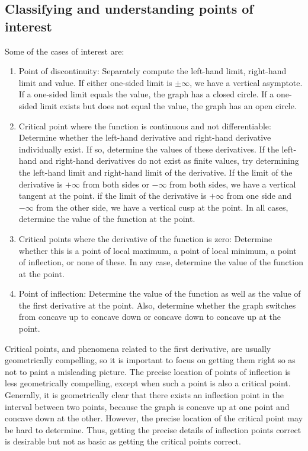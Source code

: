 \documentclass[10pt]{amsart}
\begin{document}
\subsection{Classifying and understanding points of interest}

Some of the cases of interest are:

\begin{enumerate}
\item Point of discontinuity: Separately compute the left-hand limit,
  right-hand limit and value. If either one-sided limit is $\pm
  \infty$, we have a vertical asymptote. If a one-sided limit equals
  the value, the graph has a closed circle. If a one-sided limit
  exists but does not equal the value, the graph has an open circle.
\item Critical point where the function is continuous and not
  differentiable: Determine whether the left-hand derivative and
  right-hand derivative individually exist. If so, determine the
  values of these derivatives. If the left-hand and right-hand
  derivatives do not exist as finite values, try determining the
  left-hand limit and right-hand limit of the derivative. If the limit
  of the derivative is $+\infty$ from both sides or $-\infty$ from
  both sides, we have a vertical tangent at the point. if the limit of
  the derivative is $+\infty$ from one side and $-\infty$ from the
  other side, we have a vertical cusp at the point. In all cases,
  determine the value of the function at the point.
\item Critical points where the derivative of the function is zero:
  Determine whether this is a point of local maximum, a point of local
  minimum, a point of inflection, or none of these. In any case,
  determine the value of the function at the point.
\item Point of inflection: Determine the value of the function as well
  as the value of the first derivative at the point. Also, determine
  whether the graph switches from concave up to concave down or
  concave down to concave up at the point.
\end{enumerate}

Critical points, and phenomena related to the first derivative, are
usually geometrically compelling, so it is important to focus on
getting them right so as not to paint a misleading picture. The
precise location of points of inflection is less geometrically
compelling, except when such a point is also a critical
point. Generally, it is geometrically clear that there exists an
inflection point in the interval between two points, because the graph
is concave up at one point and concave down at the other. However, the
precise location of the critical point may be hard to determine. Thus,
getting the precise details of inflection points correct is desirable
but not as basic as getting the critical points correct.
\end{document}

